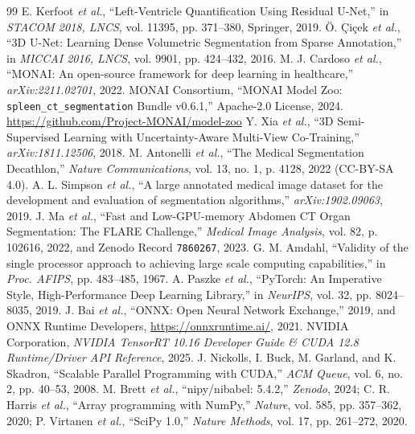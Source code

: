 \documentclass[10pt,twocolumn]{article}
\begin{document}
\begin{thebibliography}{99}
\footnotesize
{} E. Kerfoot \textit{et al.}, ``Left-Ventricle Quantification Using Residual U-Net,'' in \textit{STACOM 2018, LNCS}, vol. 11395, pp. 371--380, Springer, 2019.
 \"O. \c{C}i\c{c}ek \textit{et al.}, ``3D U-Net: Learning Dense Volumetric Segmentation from Sparse Annotation,'' in \textit{MICCAI 2016, LNCS}, vol. 9901, pp. 424--432, 2016.
 M. J. Cardoso \textit{et al.}, ``MONAI: An open-source framework for deep learning in healthcare,'' \textit{arXiv:2211.02701}, 2022.
 MONAI Consortium, ``MONAI Model Zoo: \texttt{spleen\_ct\_segmentation} Bundle v0.6.1,'' Apache-2.0 License, 2024. \url{https://github.com/Project-MONAI/model-zoo}
 Y. Xia \textit{et al.}, ``3D Semi-Supervised Learning with Uncertainty-Aware Multi-View Co-Training,'' \textit{arXiv:1811.12506}, 2018.
 M. Antonelli \textit{et al.}, ``The Medical Segmentation Decathlon,'' \textit{Nature Communications}, vol. 13, no. 1, p. 4128, 2022 (CC-BY-SA 4.0).
 A. L. Simpson \textit{et al.}, ``A large annotated medical image dataset for the development and evaluation of segmentation algorithms,'' \textit{arXiv:1902.09063}, 2019.
 J. Ma \textit{et al.}, ``Fast and Low-GPU-memory Abdomen CT Organ Segmentation: The FLARE Challenge,'' \textit{Medical Image Analysis}, vol. 82, p. 102616, 2022, and Zenodo Record \texttt{7860267}, 2023.
 G. M. Amdahl, ``Validity of the single processor approach to achieving large scale computing capabilities,'' in \textit{Proc. AFIPS}, pp. 483--485, 1967.
 A. Paszke \textit{et al.}, ``PyTorch: An Imperative Style, High-Performance Deep Learning Library,'' in \textit{NeurIPS}, vol. 32, pp. 8024--8035, 2019.
 J. Bai \textit{et al.}, ``ONNX: Open Neural Network Exchange,'' 2019, and ONNX Runtime Developers, \url{https://onnxruntime.ai/}, 2021.
 NVIDIA Corporation, \textit{NVIDIA TensorRT 10.16 Developer Guide \& CUDA 12.8 Runtime/Driver API Reference}, 2025.
 J. Nickolls, I. Buck, M. Garland, and K. Skadron, ``Scalable Parallel Programming with CUDA,'' \textit{ACM Queue}, vol. 6, no. 2, pp. 40--53, 2008.
 M. Brett \textit{et al.}, ``nipy/nibabel: 5.4.2,'' \textit{Zenodo}, 2024; C. R. Harris \textit{et al.}, ``Array programming with NumPy,'' \textit{Nature}, vol. 585, pp. 357--362, 2020; P. Virtanen \textit{et al.}, ``SciPy 1.0,'' \textit{Nature Methods}, vol. 17, pp. 261--272, 2020.

\end{thebibliography}
\end{document}
